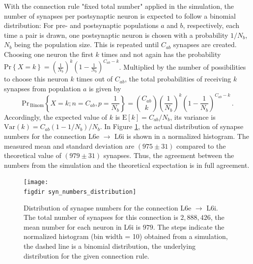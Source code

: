 With the connection rule "fixed total number" applied in the simulation, 
the number of synapses per postsynaptic neuron is expected to follow a binomial distribution:
For pre- and postsynaptic populations $a$ and $b$, respectively, 
each time a pair is drawn, one postsynaptic neuron is chosen with a probability 
$1 / N_b$, $N_b$ being the population size. This is repeated until $C_{ab}$ synapses are
created. 
Choosing one neuron the first $k$ times and not again has the probability 
$\text{Pr}\left\{X = k\right\} = 
\left( \frac{1}{N_b} \right)^{k} 
\left( 1 - \frac{1}{N_b} \right)^{C_{ab} - k}$.
Multiplied by the number of possibilities to choose this neuron $k$ times out of 
$C_{ab}$, the total probabilities of receiving $k$ synapses from population $a$ is
given by
\begin{equation}
    \text{Pr}_{\,\text{Binom}}\left\{X = k; n=C_{ab}, p=\frac{1}{N_b}\right\} = 
        {C_{ab}\choose{k}} 
        \left( \frac{1}{N_b} \right)^{k} 
        \left( 1 - \frac{1}{N_b} \right)^{C_{ab} - k} \,.
    \label{eq:binomial}
\end{equation}
Accordingly, the expected value of $k$ is $\text{E}[k] = C_{ab} / N_b$, its variance is 
$\text{Var}(k) = C_{ab} (1 - 1/N_b) / N_b$. 
In Figure \ref{fig:syn_numbers_distribution}, the actual distribution of synapse numbers 
for the connection L6e $\to$ L6i is shown in a normalized histogram. 
The measured mean and standard deviation are $(975 \pm 31)$ compared to the theoretical 
value of $(979 \pm 31)$ synapses. 
Thus, the agreement between the numbers from the simulation and the theoretical expectation is
in full agreement. 
\begin{figure}[tb]
    \centering
    \texttt{[image: \\figdir syn\_numbers\_distribution]}
    \caption{
        Distribution of synapse numbers for the connection L6e $\to$ L6i.
        The total number of synapses for this connection is $2,888,426$, 
        the mean number for each neuron in L6i is $979$.
        The steps indicate the normalized histogram (bin width = 10) obtained 
        from a simulation, the dashed line is a binomial distribution, the 
        underlying distribution for the given connection rule. 
    }
    \label{fig:syn_numbers_distribution}
\end{figure}

